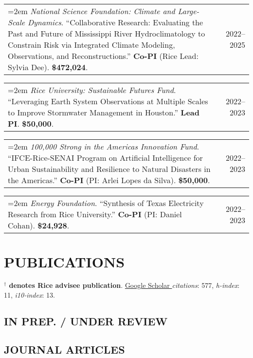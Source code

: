 \documentclass[10pt,oneside]{article}
\makeatletter
\newenvironment{alignedentrieshang}[1][2em]{%
  \noindent%
}{%
}
\newcommand{\hangingitem}[2]{%
  \noindent%
  \begin{tabular*}{\textwidth}{@{}p{0.85\textwidth}@{\extracolsep{\fill}}r@{}}%
    \hangindent=2em \hangafter=1 #1 & #2%
  \end{tabular*}%
}
\makeatother
\begin{document}
\begin{alignedentrieshang}
\hangingitem{\textit{National Science Foundation}\textit{: Climate and Large-Scale Dynamics}. ``Collaborative Research: Evaluating the Past and Future of Mississippi River Hydroclimatology to Constrain Risk via Integrated Climate Modeling, Observations, and Reconstructions.'' \textbf{Co-PI} (Rice Lead: Sylvia Dee). \textbf{\$472,024}.}{2022--2025}

\hangingitem{\textit{Rice University}\textit{: Sustainable Futures Fund}. ``Leveraging Earth System Observations at Multiple Scales to Improve Stormwater Management in Houston.'' \textbf{Lead PI}. \textbf{\$50,000}.}{2022--2023}

\hangingitem{\textit{100,000 Strong in the Americas Innovation Fund}. ``IFCE-Rice-SENAI Program on Artificial Intelligence for Urban Sustainability and Resilience to Natural Disasters in the Americas.'' \textbf{Co-PI} (PI: Arlei Lopes da Silva). \textbf{\$50,000}.}{2022--2023}

\hangingitem{\textit{Energy Foundation}. ``Synthesis of Texas Electricity Research from Rice University.'' \textbf{Co-PI} (PI: Daniel Cohan). \textbf{\$24,928}.}{2022--2023}

\end{alignedentrieshang}


\section{PUBLICATIONS}

{\textcolor{RiceBlue}{\textbf{$^\mathbf{\dagger}$ denotes Rice advisee publication}}}.
\href{https://scholar.google.com/citations?user=6ifLBBsAAAAJ}{Google Scholar \aiGoogleScholar} \textit{citations}: 577, \textit{h-index}: 11, \textit{i10-index}: 13.
\medskip


\subsection{IN PREP. / UNDER REVIEW}

\printbibliography[filter=ispreprint, heading=none, env=hanging]

\subsection{JOURNAL ARTICLES}

\printbibliography[heading=none, type=article, env=hanging]
\end{document}
